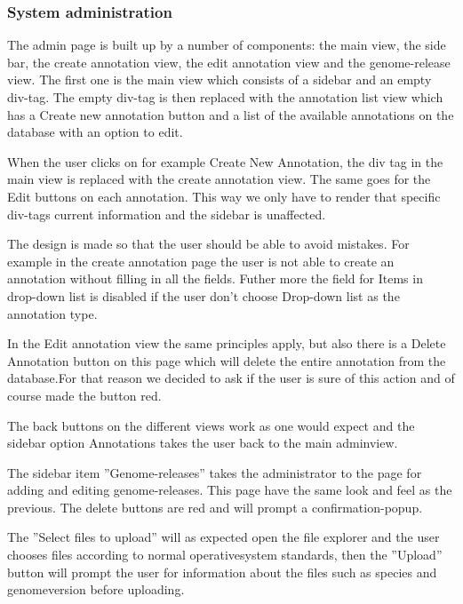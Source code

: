 \subsubsection{System administration}
The admin page is built up by a number of components: the main view, the side bar, the create annotation view, the edit annotation view and the genome-release view. The first one is the main view which consists of a sidebar and an empty div-tag. The empty div-tag is then replaced with the annotation list view which has a Create new annotation button and a list of the available annotations on the database with an option to edit. 

When the user clicks on for example Create New Annotation, the div tag in the main view is replaced with the create annotation view. The same goes for the Edit buttons on each annotation. This way we only have to render that specific div-tags current information and the sidebar is unaffected. 

The design is made so that the user should be able to avoid mistakes. For example in the create annotation page the user is not able to create an annotation without filling in all the fields. Futher more the field for Items in drop-down list is disabled if the user don't choose Drop-down list as the annotation type. 

In the Edit annotation view the same principles apply, but also there is a Delete Annotation button on this page which will delete the entire annotation from the database.For that reason we decided to ask if the user is sure of this action and of course made the button red.

The back buttons on the different views work as one would expect and the sidebar option Annotations takes the user back to the main adminview.

The sidebar item ''Genome-releases'' takes the administrator to the page for adding and editing genome-releases. This page have the same look and feel as the previous. The delete buttons are red and will prompt a confirmation-popup. 

The ''Select files to upload'' will as expected open the file explorer and the user chooses files according to normal operativesystem standards, then the ''Upload'' button will prompt the user for information about the files such as species and genomeversion before uploading. 
